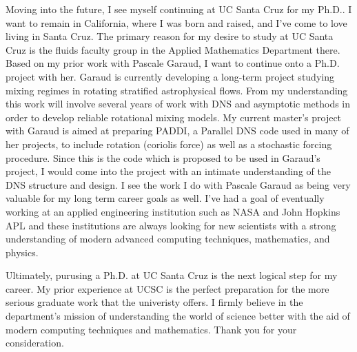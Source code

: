 \documentclass{article}
\begin{document}
Moving into the future, I see myself continuing at UC Santa Cruz for my Ph.D.. I want to remain in California, where I was born and raised, and I've come to love living in Santa Cruz. The primary reason for my desire to study at UC Santa Cruz is the fluids faculty group in the Applied Mathematics Department there. Based on my prior work with Pascale Garaud, I want to continue onto a Ph.D. project with her. Garaud is currently developing a long-term project studying mixing regimes in rotating stratified astrophysical flows. From my understanding this work will involve several years of work with DNS and asymptotic methods in order to develop reliable rotational mixing models. My current master's project with Garaud is aimed at preparing PADDI, a Parallel DNS code used in many of her projects, to include rotation (coriolis force) as well as a stochastic forcing procedure. Since this is the code which is proposed to be used in Garaud's project, I would come into the project with an intimate understanding of the DNS structure and design. I see the work I do with Pascale Garaud as being very valuable for my long term career goals as well. I've had a goal of eventually working at an applied engineering institution such as NASA and John Hopkins APL and these institutions are always looking for new scientists with a strong understanding of modern advanced computing techniques, mathematics, and physics. 

Ultimately, purusing a Ph.D. at UC Santa Cruz is the next logical step for my career. My prior experience at UCSC is the perfect preparation for the more serious graduate work that the univeristy offers. I firmly believe in the department's mission of understanding the world of science better with the aid of modern computing techniques and mathematics. Thank you for your consideration. 
\end{document}
